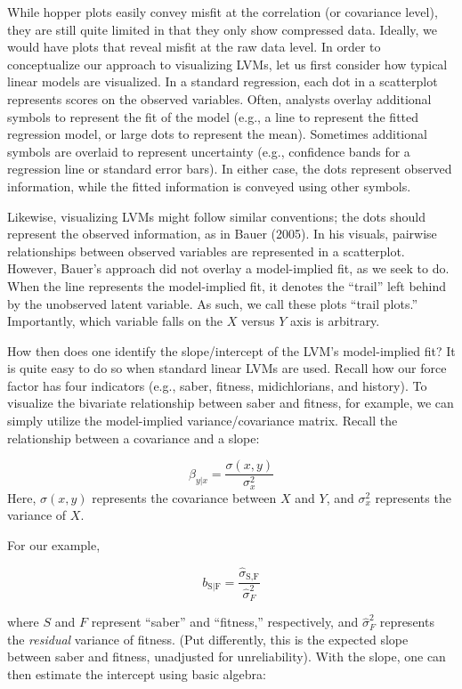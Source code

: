 \documentclass[
  english,
  man]{apa6}
\begin{document}
While hopper plots easily convey misfit at the correlation (or covariance level), they are still quite limited in that they only show compressed data. Ideally, we would have plots that reveal misfit at the raw data level. In order to conceptualize our approach to visualizing LVMs, let us first consider how typical linear models are visualized. In a standard regression, each dot in a scatterplot represents scores on the observed variables. Often, analysts overlay additional symbols to represent the fit of the model (e.g., a line to represent the fitted regression model, or large dots to represent the mean). Sometimes additional symbols are overlaid to represent uncertainty (e.g., confidence bands for a regression line or standard error bars). In either case, the dots represent observed information, while the fitted information is conveyed using other symbols.

Likewise, visualizing LVMs might follow similar conventions; the dots should represent the observed information, as in Bauer (2005). In his visuals, pairwise relationships between observed variables are represented in a scatterplot. However, Bauer's approach did not overlay a model-implied fit, as we seek to do. When the line represents the model-implied fit, it denotes the ``trail'' left behind by the unobserved latent variable. As such, we call these plots ``trail plots.'' Importantly, which variable falls on the \(X\) versus \(Y\) axis is arbitrary.

How then does one identify the slope/intercept of the LVM's model-implied fit? It is quite easy to do so when standard linear LVMs are used. Recall how our force factor has four indicators (e.g., saber, fitness, midichlorians, and history). To visualize the bivariate relationship between saber and fitness, for example, we can simply utilize the model-implied variance/covariance matrix. Recall the relationship between a covariance and a slope:

\[\beta_{y|x} = \frac{\sigma(x,y)}{\sigma^2_x}\]
\noindent Here, \(\sigma(x,y)\) represents the covariance between \(X\) and \(Y\), and \(\sigma_x^2\) represents the variance of \(X\).

For our example,

\[b_{\text{S}|\text{F}} = \frac{\hat{\sigma}_{\text{S},\text{F}}}{\hat{\sigma}^2_F}\]

\noindent where \(S\) and \(F\) represent ``saber'' and ``fitness,'' respectively, and \({\hat{\sigma}^2_F}\) represents the \emph{residual} variance of fitness. (Put differently, this is the expected slope between saber and fitness, unadjusted for unreliability). With the slope, one can then estimate the intercept using basic algebra:
\end{document}
